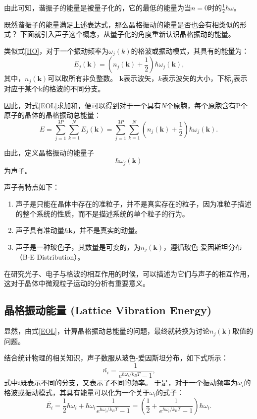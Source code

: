 \documentclass[declarePage]{ecnuthesis}
\begin{document}
由此可知，谐振子的能量是被量子化的，它的最低的能量为当$n=0$时的$\frac{1}{2} \hbar \omega$。

既然谐振子的能量满足上述表达式，那么晶格振动的能量是否也会有相类似的形式？%
下面就引入声子这个概念，从量子化的角度重新认识晶格振动的能量。

类似式\ref{HO}，对于一个振动频率为$\omega_j(k)$的格波或振动模式，其具有的能量为：
\begin{equation}
    E_j(\mathbf{k}) = (n_j(\mathbf{k}) + \frac{1}{2})\hbar \omega_j(\mathbf{k}) \text{,} \label{EOL}
\end{equation}
其中，$n_j(\mathbf{k})$可以取所有非负整数。%
$\mathbf{k}$表示波矢，$k$表示波矢的大小，下标$_j$表示对应于某个k的格波的不同分支。

因此，对式\ref{EOL}求加和，便可以得到对于一个具有$N$个原胞，每个原胞含有P个原子的晶体的晶格振动总能量：
\begin{equation}
    E = \sum_{j=1}^{3P}\sum_{k=1}^{N}E_j(\mathbf{k}) = \sum_{j=1}^{3P}\sum_{k=1}^{N}(n_j(\mathbf{k}) + \frac{1}{2})\hbar \omega_j(\mathbf{k}) \text{.} \label{EOC}
\end{equation}

由此，定义晶格振动的能量子
\begin{equation}
    \hbar \omega_j(\mathbf{k})
\end{equation}
为声子。

声子有特点如下：\cite{phonon}
\begin{enumerate}
    \item 声子是只能在晶体中存在的准粒子，并不是真实存在的粒子，因为准粒子描述的整个系统的性质，而不是描述系统的单个粒子的行为。
    \item 声子具有准动量$\hbar \mathbf{k}$，并不是真实的动量。
    \item 声子是一种玻色子，其数量是可变的，为$n_j(\mathbf{k})$，遵循玻色-爱因斯坦分布（B-E Distribution）。
\end{enumerate}

在研究光子、电子与格波的相互作用的时候，可以描述为它们与声子的相互作用，这对于晶体中微观粒子运动的分析有重要意义。

\subsection{晶格振动能量 (Lattice Vibration Energy)}

显然，由式\ref{EOL}，计算晶格振动总能量的问题，最终就转换为讨论$n_j(\mathbf{k})$取值的问题。

结合统计物理的相关知识，声子数服从玻色-爱因斯坦分布，如下式所示：
\begin{equation}
    \bar{n_i} = \frac{1}{e^{\hbar \omega_i / k_B T}-1} \text{,}
\end{equation}
式中$i$既表示不同的分支，又表示了不同的频率。%
于是，对于一个振动频率为$\omega_i$的格波或振动模式，其具有能量可以化为一个关于$\omega_i$的式子：
\begin{equation}
    \bar{E_i} = \frac{1}{2}\hbar \omega_i + \hbar \omega_i \frac{1}{e^{\hbar \omega_i / k_B T}-1} = \left(\frac{1}{2} + \frac{1}{e^{\hbar \omega_i / k_B T}-1}\right)\hbar \omega_i \text{.} \label{EOL2}
\end{equation}
\end{document}
